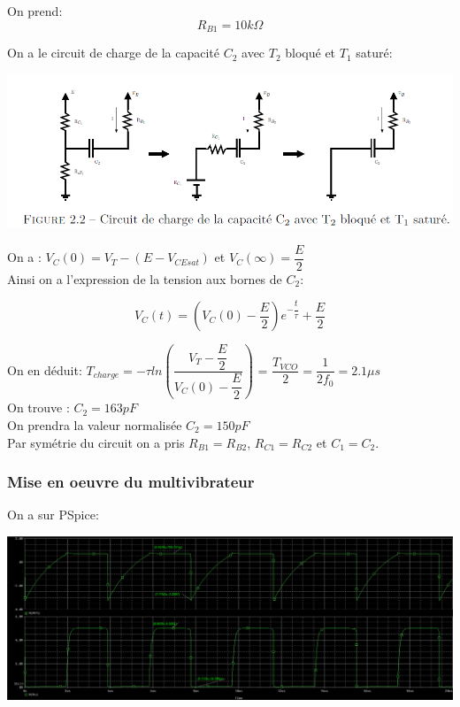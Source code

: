 \documentclass[a4paper]{report}
\begin{document}
On prend:
$$R_{B1} = 10k \Omega $$

On a le circuit de charge de la capacité $C_2$ avec $T_2$ bloqué et $T_1$ saturé:\\

\begin{center}
\includegraphics[width=1\textwidth]{circuitC2.PNG}
\end{center}


On a : \hspace{2cm} $V_C(0)=V_T-\left( E-V_{CEsat} \right)$ \hspace{2cm} et \hspace{2cm} $V_C(\infty)=\dfrac{E}{2}$\\

Ainsi on a l'expression de la tension aux bornes de $C_2$:

$$V_C(t)= \left( V_C(0)-\dfrac{E}{2} \right) e^{-\dfrac{t}{\tau}}+\dfrac{E}{2}$$

On en déduit: \hspace{3cm} $T_{charge}=-\tau ln \left( \dfrac{V_T-\dfrac{E}{2}}{V_C(0)-\dfrac{E}{2}} \right)$ = $\dfrac{T_{VCO}}{2}= \dfrac{1}{2f_0} = 2.1\mu s$\\
\vspace{0.2cm}
On trouve : \hspace{5cm} $C_2 = 163pF$\\
On prendra la valeur normalisée $C_2 = 150pF$\\

\vspace{0.5cm}
Par symétrie du circuit on a pris $R_{B1}=R_{B2}$, $R_{C1}=R_{C2}$ et  $ C_{1} = C_{2}$.\\

\newpage


\subsubsection{Mise en oeuvre du multivibrateur}

On a sur PSpice:
\begin{center}
\includegraphics[width=1\textwidth]{multivib_simu.PNG}
\end{center}
\end{document}

